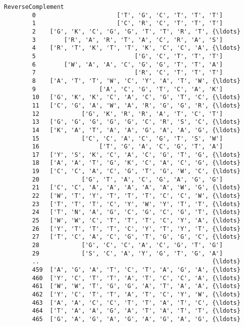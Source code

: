 \documentclass[11pt]{article}
\begin{document}
\begin{Verbatim}[commandchars=\\\{\}]
                                             ReverseComplement  
        0                       ['T', 'G', 'C', 'T', 'T', 'T']  
        1                       ['C', 'R', 'C', 'T', 'T', 'T']  
        2    ['G', 'K', 'C', 'G', 'G', 'T', 'T', 'R', 'T', {\ldots}  
        3        ['R', 'A', 'R', 'T', 'A', 'C', 'R', 'A', 'S']  
        4    ['R', 'T', 'K', 'T', 'T', 'K', 'C', 'C', 'A', {\ldots}  
        5                            ['G', 'C', 'T', 'T', 'T']  
        6        ['W', 'A', 'A', 'C', 'G', 'G', 'T', 'T', 'A']  
        7                            ['R', 'C', 'T', 'T', 'T']  
        8    ['A', 'T', 'T', 'W', 'C', 'Y', 'A', 'T', 'W', {\ldots}  
        9                  ['A', 'C', 'G', 'T', 'C', 'A', 'K']  
        10   ['G', 'K', 'K', 'C', 'A', 'C', 'G', 'T', 'C', {\ldots}  
        11   ['C', 'G', 'A', 'W', 'A', 'R', 'G', 'G', 'R', {\ldots}  
        12            ['G', 'K', 'R', 'R', 'A', 'T', 'C', 'T']  
        13   ['G', 'G', 'G', 'G', 'G', 'C', 'R', 'S', 'C', {\ldots}  
        14   ['K', 'A', 'T', 'A', 'A', 'G', 'A', 'A', 'G', {\ldots}  
        15            ['C', 'C', 'A', 'C', 'G', 'T', 'S', 'W']  
        16                 ['T', 'G', 'A', 'C', 'G', 'T', 'A']  
        17   ['Y', 'S', 'K', 'C', 'A', 'C', 'G', 'T', 'G', {\ldots}  
        18   ['A', 'A', 'T', 'G', 'K', 'C', 'A', 'C', 'G', {\ldots}  
        19   ['C', 'C', 'A', 'C', 'G', 'T', 'G', 'W', 'C', {\ldots}  
        20            ['G', 'T', 'A', 'C', 'G', 'A', 'G', 'G']  
        21   ['C', 'C', 'A', 'A', 'A', 'A', 'A', 'W', 'G', {\ldots}  
        22   ['W', 'T', 'Y', 'T', 'T', 'T', 'C', 'C', 'W', {\ldots}  
        23   ['T', 'T', 'T', 'C', 'Y', 'W', 'Y', 'T', 'T', {\ldots}  
        24   ['T', 'N', 'A', 'G', 'C', 'G', 'C', 'G', 'T', {\ldots}  
        25   ['W', 'W', 'C', 'T', 'T', 'T', 'C', 'Y', 'A', {\ldots}  
        26   ['Y', 'T', 'T', 'T', 'C', 'Y', 'T', 'Y', 'T', {\ldots}  
        27   ['T', 'C', 'A', 'C', 'G', 'T', 'G', 'G', 'C', {\ldots}  
        28            ['G', 'C', 'C', 'A', 'C', 'G', 'T', 'G']  
        29            ['S', 'C', 'A', 'Y', 'G', 'T', 'G', 'A']  
        ..                                                 {\ldots}  
        459  ['A', 'G', 'A', 'T', 'C', 'T', 'A', 'G', 'A', {\ldots}  
        460  ['Y', 'C', 'T', 'T', 'A', 'T', 'C', 'C', 'A', {\ldots}  
        461  ['W', 'W', 'T', 'G', 'G', 'A', 'T', 'A', 'A', {\ldots}  
        462  ['Y', 'C', 'T', 'T', 'A', 'T', 'C', 'Y', 'W', {\ldots}  
        463  ['A', 'A', 'C', 'C', 'T', 'T', 'A', 'T', 'C', {\ldots}  
        464  ['T', 'A', 'A', 'G', 'A', 'T', 'A', 'T', 'T', {\ldots}  
        465  ['G', 'A', 'G', 'A', 'G', 'A', 'G', 'A', 'G', {\ldots}  

\end{Verbatim}
\end{document}
